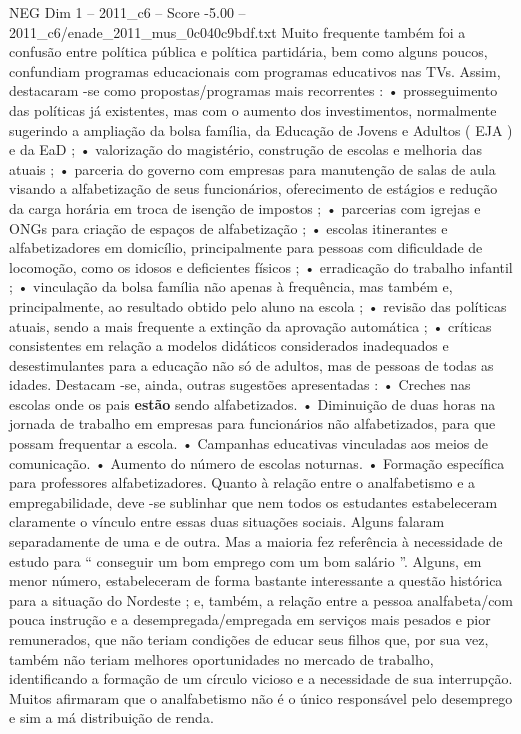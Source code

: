 \begin{textsample}{NEG Dim 1 – 2011\_c6 – Score -5.00 – 2011\_c6/enade\_2011\_mus\_0c040c9bdf.txt}
Muito frequente também foi a confusão entre política pública e política partidária, bem como alguns poucos, confundiam programas educacionais com programas educativos nas TVs.
Assim, destacaram -se como propostas/programas mais recorrentes : • prosseguimento das políticas já existentes, mas com o aumento dos investimentos, normalmente sugerindo a ampliação da bolsa família, da Educação de Jovens e Adultos ( EJA ) e da EaD ; • valorização do magistério, construção de escolas e melhoria das atuais ; • parceria do governo com empresas para manutenção de salas de aula visando a alfabetização de seus funcionários, oferecimento de estágios e redução da carga horária em troca de isenção de impostos ; • parcerias com igrejas e ONGs para criação de espaços de alfabetização ; • escolas itinerantes e alfabetizadores em domicílio, principalmente para pessoas com dificuldade de locomoção, como os idosos e deficientes físicos ; • erradicação do trabalho infantil ; • vinculação da bolsa família não apenas à frequência, mas também e, principalmente, ao resultado obtido pelo aluno na escola ; • revisão das políticas atuais, sendo a mais frequente a extinção da aprovação automática ; • críticas consistentes em relação a modelos didáticos considerados inadequados e desestimulantes para a educação não só de adultos, mas de pessoas de todas as idades.
Destacam -se, ainda, outras sugestões apresentadas : • Creches nas escolas onde os pais \textbf{estão} sendo alfabetizados. • Diminuição de duas horas na jornada de trabalho em empresas para funcionários não alfabetizados, para que possam frequentar a escola. • Campanhas educativas vinculadas aos meios de comunicação. • Aumento do número de escolas noturnas. • Formação específica para professores alfabetizadores.
Quanto à relação entre o analfabetismo e a empregabilidade, deve -se sublinhar que nem todos os estudantes estabeleceram claramente o vínculo entre essas duas situações sociais.
Alguns falaram separadamente de uma e de outra.
Mas a maioria fez referência à necessidade de estudo para “ conseguir um bom emprego com um bom salário ”.
Alguns, em menor número, estabeleceram de forma bastante interessante a questão histórica para a situação do Nordeste ; e, também, a relação entre a pessoa analfabeta/com pouca instrução e a desempregada/empregada em serviços mais pesados e pior remunerados, que não teriam condições de educar seus filhos que, por sua vez, também não teriam melhores oportunidades no mercado de trabalho, identificando a formação de um círculo vicioso e a necessidade de sua interrupção.
Muitos afirmaram que o analfabetismo não é o único responsável pelo desemprego e sim a má distribuição de renda.

\end{textsample}
